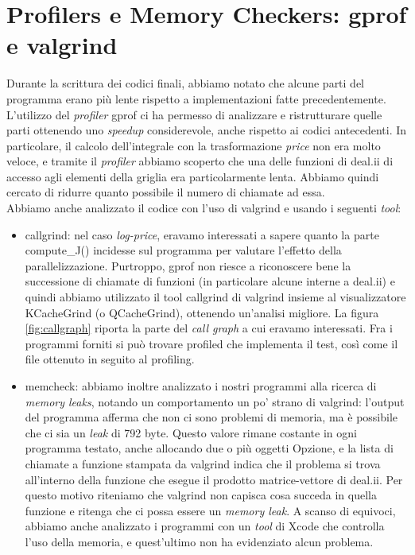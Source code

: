 \documentclass[a4paper,10pt]{report}
\theoremstyle{plain}
\theoremstyle{definition}
\theoremstyle{remark}
\begin{document}
\section{Profilers e Memory Checkers: \textsf{gprof} e \textsf{valgrind}}
Durante la scrittura dei codici finali, abbiamo notato che alcune parti del programma erano più lente rispetto a implementazioni fatte precedentemente. L'utilizzo del \emph{profiler} \textsf{gprof} ci ha permesso di analizzare e ristrutturare quelle parti ottenendo uno \emph{speedup} considerevole, anche rispetto ai codici antecedenti. In particolare, il calcolo dell'integrale con la trasformazione \emph{price} non era molto veloce, e tramite il \emph{profiler} abbiamo scoperto che una delle funzioni di \textsf{deal.ii} di accesso agli elementi della griglia era particolarmente lenta. Abbiamo quindi cercato di ridurre quanto possibile il numero di chiamate ad essa.\\
Abbiamo anche analizzato il codice con l'uso di \textsf{valgrind} e usando i seguenti \emph{tool}:
\begin{itemize}
 \item \textsf{callgrind}: nel caso \emph{log-price}, eravamo interessati a sapere quanto la parte \textsf{compute\_J()} incidesse sul programma per valutare l'effetto della parallelizzazione. Purtroppo, \textsf{gprof} non riesce a riconoscere bene la successione di chiamate di funzioni (in particolare alcune interne a \textsf{deal.ii}) e quindi abbiamo utilizzato il tool \textsf{callgrind} di \textsf{valgrind} insieme al visualizzatore \textsf{KCacheGrind} (o \textsf{QCacheGrind}), ottenendo un'analisi migliore. La figura \ref{fig:callgraph} riporta la parte del \emph{call graph} a cui eravamo interessati. Fra i programmi forniti si può trovare \textsf{profiled} che implementa il test, cos\`i come il file ottenuto in seguito al profiling.
 \item \textsf{memcheck}: abbiamo inoltre analizzato i nostri programmi alla ricerca di \emph{memory leaks}, notando un comportamento un po' strano di \textsf{valgrind}: l'output del programma afferma che non ci sono problemi di memoria, ma \`e possibile che ci sia un \emph{leak} di 792 byte. Questo valore rimane costante in ogni programma testato, anche allocando due o pi\`u oggetti Opzione, e la lista di chiamate a funzione stampata da \textsf{valgrind} indica che il problema si trova all'interno della funzione che esegue il prodotto matrice-vettore di \textsf{deal.ii}. Per questo motivo riteniamo che \textsf{valgrind} non capisca cosa succeda in quella funzione e ritenga che ci possa essere un \emph{memory leak}. A scanso di equivoci, abbiamo anche analizzato i programmi con un \emph{tool} di Xcode che controlla l'uso della memoria, e quest'ultimo non ha evidenziato alcun problema.
\end{itemize}
\end{document}
